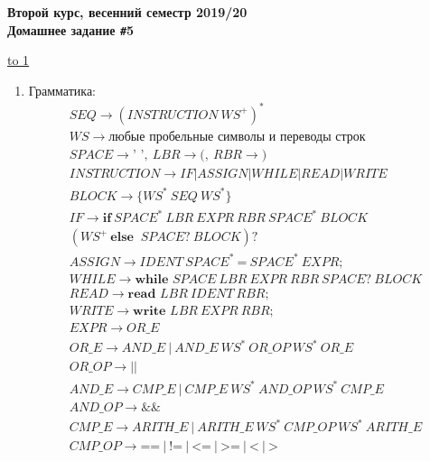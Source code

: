 \documentclass[14pt]{extarticle}
\def\t{\texttt}               %
\def\NO{\t{\#}}               %
\def\LINE{\vspace*{-1em}\noindent \underline{\hbox to 1\textwidth{{ } \hfil{ } \hfil{ } }}}
\begin{document}
\renewcommand{\dateseparator}{--}
\begin{center}
    {\Large\bf
        Второй курс, весенний семестр 2019/20\\
        Домашнее задание \NO5 \\
    }
\end{center}

\vspace{-1em}
\LINE
\vspace{1em}


\pagestyle{fancy}
\begin{enumerate}
    \item Грамматика:
          \begin{gather*}
              SEQ \to (INSTRUCTION\ WS^+)^*\\
              WS \to \textbf{любые пробельные символы и переводы строк}\\
              SPACE \to \textbf{' '},\ LBR \to \textbf{(},\ RBR \to \textbf{)}\\
              INSTRUCTION \to IF | ASSIGN | WHILE | READ | WRITE \\
              BLOCK \to \{ WS^*\ SEQ\ WS^*\}\\
              IF \to \textbf{if}\ SPACE^*\ LBR\ EXPR\ RBR \ SPACE^*\ BLOCK \\
              (WS^+\ \textbf{else } \ SPACE?\ BLOCK)?\\
              ASSIGN \to IDENT\ SPACE^*\ \textbf{=}\ SPACE^*\ EXPR\text{;}\\
              WHILE \to \textbf{while } SPACE\ LBR\ EXPR\ RBR \ SPACE?\ BLOCK\\
              READ \to \textbf{read } LBR\ IDENT \ RBR \text{;}\\
              WRITE \to \textbf{write } LBR\ EXPR \ RBR \text{;}\\
              EXPR \to OR\_E\\
              OR\_E \to AND\_E\ |\ AND\_E\ WS^*\ OR\_OP\ WS^*\ OR\_E\\
              OR\_OP \to \textbf{||}\\
              AND\_E \to CMP\_E\ |\ CMP\_E\ WS^*\ AND\_OP\ WS^*\ CMP\_E\\
              AND\_OP \to \textbf{\&\&}\\
              CMP\_E \to ARITH\_E\ |\ ARITH\_E\ WS^*\ CMP\_OP\ WS^*\ ARITH\_E\\
              CMP\_OP \to \textbf{==}\ |\ \textbf{!=}\ |\ \textbf{<=}\ |\ \textbf{>=}\ |\
              \textbf{<}\ |\ \textbf{>}\\

\end{gather*}
\end{enumerate}
\end{document}
